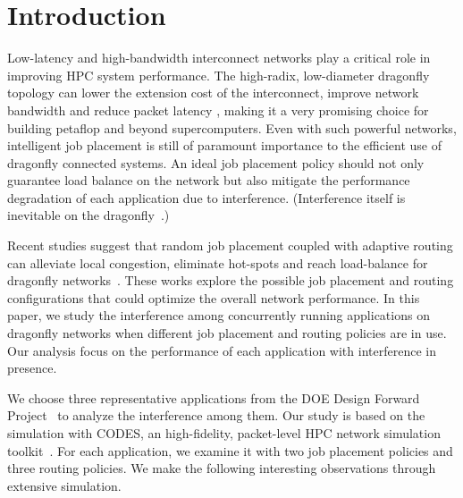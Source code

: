 \section{Introduction}
\label{sec:intro}

Low-latency and high-bandwidth interconnect networks play a critical role in improving HPC system performance. 
The high-radix, low-diameter dragonfly topology can lower the extension cost of the interconnect, improve network bandwidth and reduce packet latency \cite{dally-dragonfly}, 
making it a very promising choice for building petaflop and beyond supercomputers. 
Even with such powerful networks, 
intelligent job placement is still of paramount importance to the efficient use of dragonfly connected systems. 
An ideal job placement policy should not only guarantee load balance on the network 
but also mitigate the performance degradation of each application due to interference.  
(Interference itself is inevitable on the dragonfly~\cite{bhatele2015, dskinner}.)

Recent studies suggest that random job placement coupled with adaptive routing can alleviate local congestion, eliminate hot-spots and reach load-balance for dragonfly networks~\cite{jain-sc14, bhatele-sc11, brandt2014}. These works explore the possible job placement and routing configurations that could optimize the overall network performance.
In this paper, we study the interference among concurrently running applications on dragonfly networks when different job placement and routing policies are in use. 
Our analysis focus on the performance of each application with interference in presence. 



We choose three representative applications from the DOE Design Forward Project~\cite{designforwardwebpage} to analyze the interference among them. Our study is based on the simulation with CODES, an high-fidelity, packet-level HPC network simulation toolkit~\cite{codes}.
For each application, we examine it with two job placement policies and three routing policies.
We make the following interesting observations through extensive simulation.


